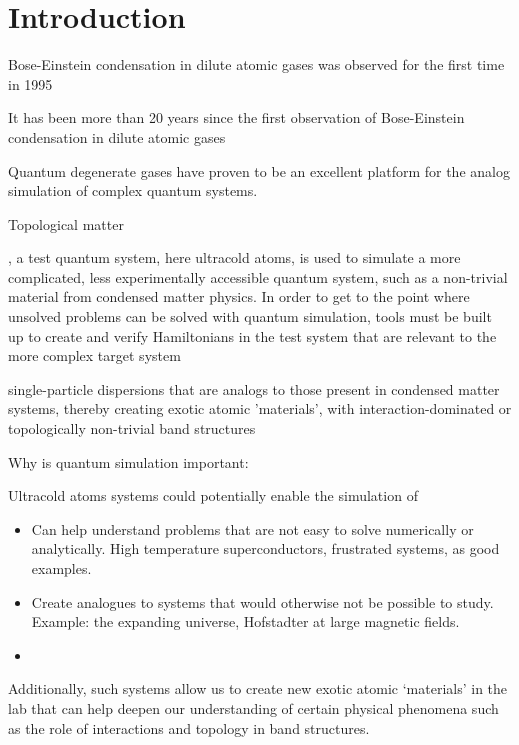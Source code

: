 
\renewcommand{\thechapter}{1}

\chapter{Introduction}

Bose-Einstein condensation in dilute atomic gases was observed for the first time in 1995 

It has been more than 20 years since the first observation of Bose-Einstein condensation in dilute atomic gases


Quantum degenerate gases have proven to be an excellent platform for the analog simulation of complex quantum systems.

Topological matter

, a test quantum system, here ultracold atoms, is used to simulate a more
complicated, less experimentally accessible quantum system, such as a non-trivial
material from condensed matter physics. In order to get to the point where unsolved
problems can be solved with quantum simulation, tools must be built up to create
and verify Hamiltonians in the test system that are relevant to the more complex
target system

single-particle dispersions that are analogs to those present in condensed matter systems, thereby creating exotic atomic 'materials', with interaction-dominated or topologically non-trivial band structures

Why is quantum simulation important:

Ultracold atoms systems could potentially enable the simulation of 

\begin{itemize}
	\item Can help understand problems that are not easy to solve numerically or analytically. High temperature superconductors, frustrated systems, as good examples.
	\item Create analogues to systems that would otherwise not be possible to study. Example: the expanding universe, Hofstadter at large magnetic fields.
	\item 
\end{itemize}


Additionally, such systems allow us to create new exotic atomic `materials' in the lab that can help deepen our understanding of certain physical phenomena such as the role of interactions and topology in band structures. 

